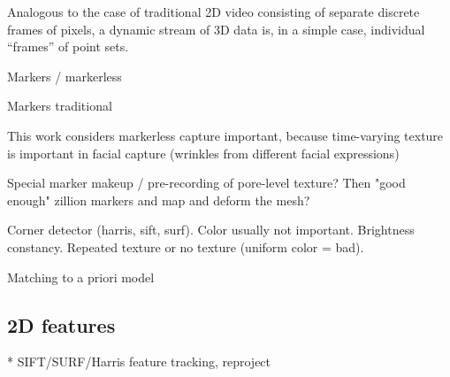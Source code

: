 Analogous to the case of traditional 2D video consisting of separate discrete frames of pixels, a dynamic stream of 3D data is, in a simple case, individual ``frames'' of point sets.

Markers / markerless

Markers traditional


This work considers markerless capture important, because time-varying texture is important in facial capture (wrinkles from different facial expressions)

Special marker makeup / pre-recording of pore-level texture? Then "good enough" zillion markers and map and deform the mesh?

Corner detector (harris, sift, surf). Color usually not important. Brightness constancy. Repeated texture or no texture (uniform color = bad).

Matching to a priori model

\subsection{2D features}

* SIFT/SURF/Harris feature tracking, reproject

